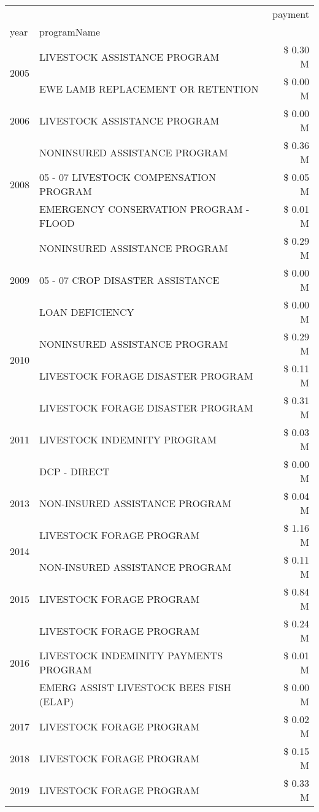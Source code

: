 \begin{tabular}{llr}
\toprule
 &  & payment \\
year & programName &  \\
\midrule
\multirow[t]{2}{*}{2005} & LIVESTOCK ASSISTANCE PROGRAM & \$ 0.30 M \\
 & EWE LAMB REPLACEMENT OR RETENTION & \$ 0.00 M \\
\cline{1-3}
2006 & LIVESTOCK ASSISTANCE PROGRAM & \$ 0.00 M \\
\cline{1-3}
\multirow[t]{3}{*}{2008} & NONINSURED ASSISTANCE PROGRAM & \$ 0.36 M \\
 & 05 - 07 LIVESTOCK COMPENSATION PROGRAM & \$ 0.05 M \\
 & EMERGENCY CONSERVATION PROGRAM - FLOOD & \$ 0.01 M \\
\cline{1-3}
\multirow[t]{3}{*}{2009} & NONINSURED ASSISTANCE PROGRAM & \$ 0.29 M \\
 & 05 - 07 CROP DISASTER ASSISTANCE & \$ 0.00 M \\
 & LOAN DEFICIENCY & \$ 0.00 M \\
\cline{1-3}
\multirow[t]{2}{*}{2010} & NONINSURED ASSISTANCE PROGRAM & \$ 0.29 M \\
 & LIVESTOCK FORAGE DISASTER PROGRAM & \$ 0.11 M \\
\cline{1-3}
\multirow[t]{3}{*}{2011} & LIVESTOCK FORAGE DISASTER PROGRAM & \$ 0.31 M \\
 & LIVESTOCK INDEMNITY PROGRAM & \$ 0.03 M \\
 & DCP - DIRECT & \$ 0.00 M \\
\cline{1-3}
2013 & NON-INSURED ASSISTANCE PROGRAM & \$ 0.04 M \\
\cline{1-3}
\multirow[t]{2}{*}{2014} & LIVESTOCK FORAGE PROGRAM & \$ 1.16 M \\
 & NON-INSURED ASSISTANCE PROGRAM & \$ 0.11 M \\
\cline{1-3}
2015 & LIVESTOCK FORAGE PROGRAM & \$ 0.84 M \\
\cline{1-3}
\multirow[t]{3}{*}{2016} & LIVESTOCK FORAGE PROGRAM & \$ 0.24 M \\
 & LIVESTOCK INDEMINITY PAYMENTS PROGRAM & \$ 0.01 M \\
 & EMERG ASSIST LIVESTOCK BEES FISH (ELAP) & \$ 0.00 M \\
\cline{1-3}
2017 & LIVESTOCK FORAGE PROGRAM & \$ 0.02 M \\
\cline{1-3}
2018 & LIVESTOCK FORAGE PROGRAM & \$ 0.15 M \\
\cline{1-3}
2019 & LIVESTOCK FORAGE PROGRAM & \$ 0.33 M \\

\end{tabular}
